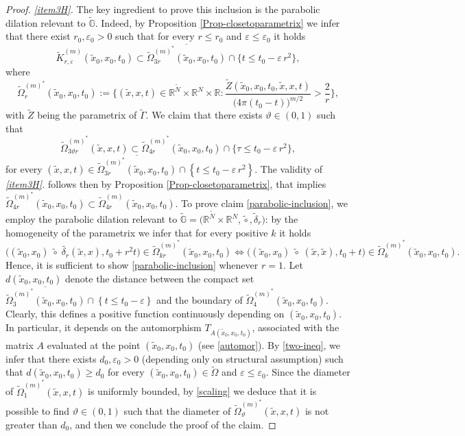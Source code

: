 \documentclass[10pt,a4paper]{amsart}
\def \G {{\Gamma}}
\def \GG {{\mathbb{G}}}
\def \O {{\Omega}}
\newcommand{\R}{\mathbb{R}}
\def \d {{\delta}}
\def \e {{\varepsilon}}
\def \rn {{\mathbb {R}}^{N}}
\def \rnm {{\mathbb {R}}^{\tilde N}}
\def \t {{\tau}}
\def \ti {\times}
\def \tt {\tilde}
\begin{document}
\begin{proof}
	
	\medskip
	\emph{\ref{item3H}.} The key ingredient to prove this inclusion is the parabolic dilation relevant to $\tt\GG$. Indeed, by Proposition \ref{Prop-closetoparametrix} we infer that there exist $r_0,\e_0>0$ such that for every $r\leq r_0$ and $\e\leq \e_0$ it holds
	\begin{equation}\label{casinalbo}
		\tt K_{r,\e}^{(m)}(\tt x_0, x_0, t_0)\subset \overline {\tt \O^{(m)^*}_{3 r}(\tt x_0, x_0, t_0)}\cap \Big\{t\leq t_0 -\e\, r^2\Big\},
	\end{equation} 
	where
	\begin{equation}
		\tt \O^{(m)^*}_{r}(\tt x_0,x_0, t_0):=\Bigg\{(\tt x, x ,t) \in \rnm\ti\rn\ti \R :\frac{\tt Z(\tt x_0, x_0, t_0,\tt x, x ,t)}{\big( 4\pi(t_0-t)\big)^{m/2}}>\frac{2}{r} \Bigg\},
	\end{equation}
	with $\tt Z$ being the parametrix of $\tt \G$. We claim that there exists $\vartheta \in (0,1)$ such that 
	\begin{equation}\label{parabolic-inclusion}
		\tt \O^{(m)^*}_{3\vartheta r}(\tt x, x, t)\subset \tt \O^{(m)^*}_{4 r}(\tt x_0, x_0, t_0)\cap \Big\{\t\leq t_0 - \e\,r^2\Big\},
	\end{equation}
	for every $(\tt x,x, t)\in  \overline {\tt \O^{(m)^*}_{3 r}(\tt x_0, x_0, t_0)}\cap \left\{t\leq t_0 - \e\, r^2\right\}$. The validity of \emph{\ref{item3H}.} follows then by Proposition \ref{Prop-closetoparametrix}, that implies $\tt \O^{(m)^*}_{4r}(\tt x_0,x_0, t_0)\subset\tt \O^{(m)}_{4r}(\tt x_0, x_0, t_0)$. To prove claim \eqref{parabolic-inclusion}, we employ the parabolic dilation relevant to $\tt\GG=\Big(\rnm\times \rn,\tt \circ,\tt \d_r\Big)$: by the homogeneity of the parametrix we infer that for every positive $k$ it holds 
	\begin{equation}\label{scaling}
		\Big((\tt x_0,x_0)\;\tt\circ \;\tt{\d_{r}}(\tt x,x),t_0+r^2t\Big)\in \tt \O^{(m)^*}_{k r}(\tt x_0,x_0, t_0)\iff \Big((\tt x_0,x_0)\;\tt\circ \;(\tt x,\tt x),t_0+t\Big)\in \tt \O^{(m)^*}_{k}(\tt x_0, x_0, t_0).
	\end{equation}
	Hence, it is sufficient to show \eqref{parabolic-inclusion} whenever $r=1$. Let $d(\tt x_0, x_0,t_0)$ denote the distance between the compact set $\overline {\tt \O^{(m)^*}_{3}(\tt x_0, x_0, t_0)}\cap \left\{t\leq t_0 - \e\right\}$ and the boundary of $\tt \O^{(m)^*}_{4}(\tt x_0, x_0, t_0)$. Clearly, this defines a positive function continuously depending on $(\tt x_0, x_0,t_0)$. In particular, it depends on the  automorphism $T_{A(\tt x_0, x_0,t_0)}$, associated with the matrix $A$ evaluated at the point $(\tt x_0, x_0,t_0)$ (see \eqref{automor}). By \eqref{two-ineq}, we infer that there exists $d_0,\e_0>0$ (depending only on structural assumption) such that $d(\tt x_0, x_0,t_0)\geq d_0$ for every $(\tt x_0, x_0,t_0)\in \tt\O$ and $\e\leq\e_0$. Since the diameter of $\tt\O_1^{(m)^*}(\tt x, x,t)$ is uniformly bounded, by \eqref{scaling} we deduce that it is possible to find $\vartheta \in (0,1)$ such that the diameter of $\tt\O_\vartheta^{(m)^*}(\tt x,x,t)$ is not greater than $d_0$, and then we conclude the proof of the claim.
	

\end{proof}
\end{document}
